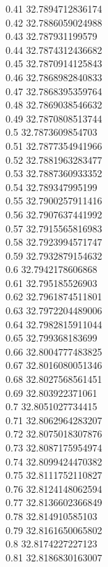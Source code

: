 {0.41	32.7894712836174\\
0.42	32.7886059024988\\
0.43	32.787931199579\\
0.44	32.7874312436682\\
0.45	32.7870914125843\\
0.46	32.7868982840833\\
0.47	32.7868395359764\\
0.48	32.7869038546632\\
0.49	32.7870808513744\\
0.5	32.7873609854703\\
0.51	32.7877354941966\\
0.52	32.7881963283477\\
0.53	32.7887360933352\\
0.54	32.789347995199\\
0.55	32.7900257911416\\
0.56	32.7907637441992\\
0.57	32.7915565816983\\
0.58	32.7923994571747\\
0.59	32.7932879154632\\
0.6	32.7942178606868\\
0.61	32.795185526903\\
0.62	32.7961874511801\\
0.63	32.7972204489006\\
0.64	32.7982815911044\\
0.65	32.799368183699\\
0.66	32.8004777483825\\
0.67	32.8016080051346\\
0.68	32.8027568561451\\
0.69	32.803922371061\\
0.7	32.8051027734415\\
0.71	32.8062964283207\\
0.72	32.8075018307876\\
0.73	32.8087175954974\\
0.74	32.8099424470382\\
0.75	32.8111752110827\\
0.76	32.8124148062594\\
0.77	32.8136602366849\\
0.78	32.814910585103\\
0.79	32.8161650065802\\
0.8	32.8174227227123\\
0.81	32.8186830163007\\
}
